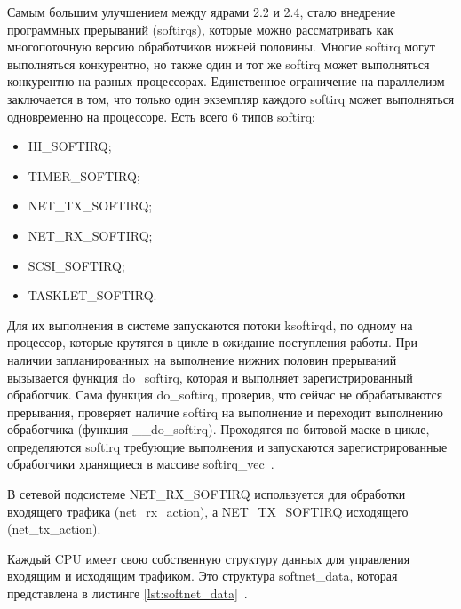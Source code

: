 Самым большим улучшением между ядрами 2.2 и 2.4, стало внедрение программных прерываний (softirqs), которые можно рассматривать как многопоточную версию обработчиков нижней половины. Многие softirq могут выполняться конкурентно, но также один и тот же softirq может выполняться конкурентно на разных процессорах. Единственное ограничение на параллелизм заключается в том, что только один экземпляр каждого softirq может выполняться одновременно на процессоре. Есть всего 6 типов softirq:
\begin{itemize}[label=---]
	\item HI\_SOFTIRQ;
	\item TIMER\_SOFTIRQ;
	\item NET\_TX\_SOFTIRQ;
	\item NET\_RX\_SOFTIRQ;
	\item SCSI\_SOFTIRQ;
	\item TASKLET\_SOFTIRQ.
\end{itemize}

Для их выполнения в системе запускаются потоки ksoftirqd, по одному на процессор, которые крутятся в цикле в ожидание поступления работы. При наличии запланированных на выполнение нижних половин прерываний вызывается функция do\_softirq, которая и выполняет зарегистрированный обработчик. Сама функция do\_softirq, проверив, что сейчас не обрабатываются прерывания, проверяет наличие softirq на выполнение и переходит выполнению обработчика (функция \_\_do\_softirq). Проходятся по битовой маске в цикле, определяются softirq требующие выполнения и запускаются зарегистрированные обработчики хранящиеся в массиве softirq\_vec~\cite{guide}. 

В сетевой подсистеме NET\_RX\_SOFTIRQ используется для обработки входящего трафика (net\_rx\_action), а NET\_TX\_SOFTIRQ исходящего (net\_tx\_action).

Каждый CPU имеет свою собственную структуру данных для управления входящим и исходящим трафиком. Это структура  softnet\_data, которая представлена в листинге \ref{lst:softnet_data}~\cite{softnet_data}.

